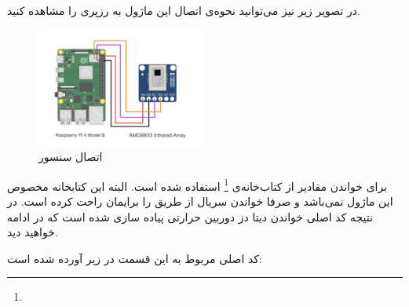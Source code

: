 در تصویر زیر نیز می‌توانید نحوه‌ی اتصال این ماژول به رزپری را مشاهده کنید.

\begin{figure}[H]
	\centering
	\includegraphics[width=0.5\textwidth]{figs/amg8833_RPi4_wiring.png}
	
	\caption{اتصال سنسور }
	\label{fig:2}
\end{figure}


برای خواندن مقادیر از کتاب‌خانه‌ی 
\footnote{}
استفاده شده است. البته این کتابخانه مخصوص این ماژول نمی‌باشد و صرفا خواندن سریال از طریق  را برایمان راحت کرده است. در نتیجه کد اصلی خواندن دیتا دز دوربین حرارتی پیاده سازی شده است که در ادامه خواهید دید.

کد اصلی مربوط به این قسمت در زیر آورده شده است:

